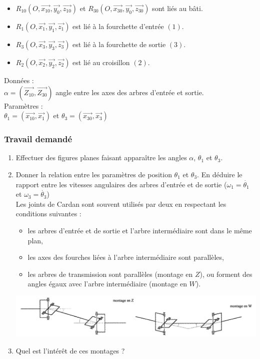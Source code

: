 \begin{itemize}
\item $R_{10}(O,\overrightarrow{x_{10}},\overrightarrow{y_0},\overrightarrow{z_{10}})$ et $R_{30}(O,\overrightarrow{x_{30}},\overrightarrow{y_0},\overrightarrow{z_{30}})$ sont liés au bâti.
\item $R_1(O,\overrightarrow{x_1},\overrightarrow{y_1},\overrightarrow{z_1})$ est lié à la fourchette d'entrée $(1)$.
\item $R_3(O,\overrightarrow{x_3},\overrightarrow{y_3},\overrightarrow{z_3})$ est lié à la fourchette de sortie $(3)$.
\item $R_2(O,\overrightarrow{x_2},\overrightarrow{y_2},\overrightarrow{z_2})$ est lié au croisillon $(2)$.
\end{itemize}

Données :\\
$\alpha=(\overrightarrow{Z_{10}},\overrightarrow{Z_{30}})$ angle entre les axes des arbres d'entrée et sortie.\\
Paramètres :\\
$\theta_1=(\overrightarrow{x_{10}},\overrightarrow{x_1})$ et $\theta_3=(\overrightarrow{x_{30}},\overrightarrow{x_3})$

\subsubsection{Travail demandé}
\begin{enumerate}
\item Effectuer des figures planes faisant apparaître les angles $\alpha$, $\theta_1$ et $\theta_3$.
\item Donner la relation entre les paramètres de position $\theta_1$ et $\theta_3$. En déduire le rapport entre les vitesses angulaires des arbres d'entrée et de sortie ($\omega_1=\dot{\theta_1}$ et $\omega_3=\dot{\theta_3}$)\\

Les joints de Cardan sont souvent utilisés par deux en respectant les conditions suivantes :
\begin{itemize}
\item les arbres d'entrée et de sortie et l'arbre intermédiaire sont dans le même plan,
\item les axes des fourches liées à l'arbre intermédiaire sont parallèles,
\item les arbres de transmission sont parallèles (montage en $Z$), ou forment des angles égaux avec l'arbre intermédiaire (montage en $W$).
\end{itemize}

\begin{center}
    \includegraphics[scale=0.4]{png/3_exo6.png}
\end{center}

\item Quel est l'intérêt de ces montages ?
\end{enumerate}

